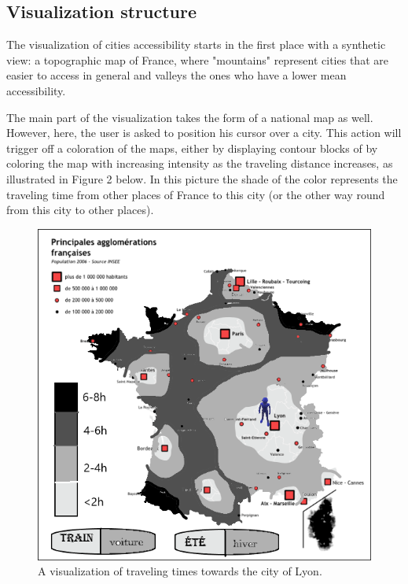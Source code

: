 \documentclass{vgtc}                          %
\begin{document}
\subsection{Visualization structure}

The visualization of cities accessibility starts in the first place with a synthetic view: a topographic map of France, where "mountains" represent cities that are easier to access in general and valleys the ones who have a lower mean accessibility.  
  
The main part of the visualization takes the form of a national map as well. However, here, the user is asked to position his cursor over a city. This action will trigger off a coloration of the maps, either by displaying contour blocks of by coloring the map with increasing intensity as the traveling distance increases, as illustrated in Figure 2 below. In this picture the shade of the color represents the traveling time from other places of France to this city (or the other way round from this city to other places).




\begin{figure}[h]
 \centering %
 \includegraphics[scale=1, width=\columnwidth]{carte-france23.png}
 \caption{A visualization of traveling times towards the city of Lyon.}
 \label{fig:sample}
\end{figure}
\end{document}
